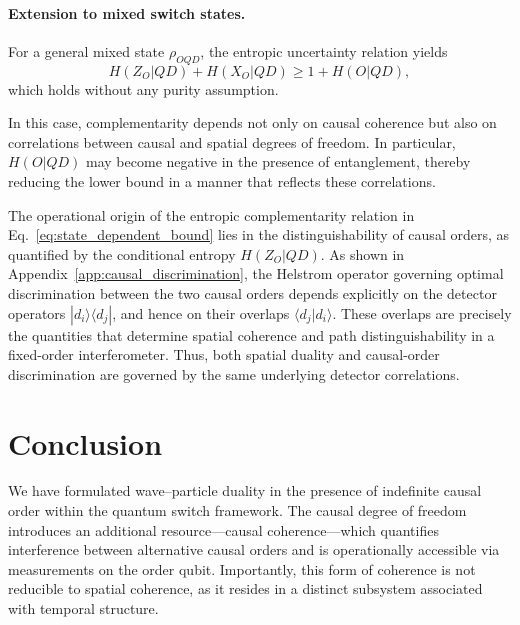 \documentclass[aps,pra,reprint,superscriptaddress]{revtex4-2}
\begin{document}
\medskip

\paragraph*{Extension to mixed switch states.}

For a general mixed state $\rho_{OQD}$, the entropic uncertainty
relation yields
\begin{equation}
H(Z_O|QD) + H(X_O|QD) \ge 1 + H(O|QD),
\end{equation}
which holds without any purity assumption.

In this case, complementarity depends not only on causal coherence but also on correlations between causal and spatial degrees of freedom. In particular, $H(O|QD)$ may become negative in the presence of entanglement, thereby reducing the lower bound in a manner that reflects these correlations.

\medskip

The operational origin of the entropic complementarity relation in Eq.~\eqref{eq:state_dependent_bound} lies in the distinguishability of causal orders, as quantified by the conditional entropy $H(Z_O|QD)$. 
As shown in Appendix~\ref{app:causal_discrimination}, the Helstrom operator governing optimal discrimination between the two causal orders depends explicitly on the detector operators $|d_i\rangle\langle d_j|$, and hence on their overlaps $\langle d_j|d_i\rangle$. 
These overlaps are precisely the quantities that determine spatial coherence and path distinguishability in a fixed-order interferometer. 
Thus, both spatial duality and causal-order discrimination are governed by the same underlying detector correlations.

\section{Conclusion}\label{sec:conc}

We have formulated wave--particle duality in the presence of indefinite causal order within the quantum switch framework. The causal degree of freedom introduces an additional resource—causal coherence—which quantifies interference between alternative causal orders and is operationally accessible via measurements on the order qubit. Importantly, this form of coherence is not reducible to spatial coherence, as it resides in a distinct subsystem associated with temporal structure.
\end{document}
